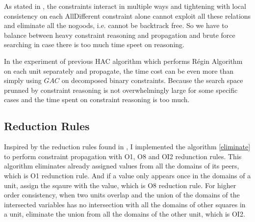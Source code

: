 \documentclass[a4paper, 12pt]{report}
\begin{document}
            As stated in \cite{simonis2005sudoku}, the constraints interact in multiple ways and tightening with local consistency on each AllDifferent constraint alone cannot exploit all these relations and eliminate all the nogoods, i.e. cannot be backtrack free. So we have to balance between heavy constraint reasoning and propagation and brute force searching in case there is too much time speet on reasoning.

            In the experiment of previous HAC algorithm which performs Régin Algorithm on each unit separately and propagate, the time cost can be even more than simply using $GAC$ on decomposed binary constraints. Because the search
            space prunned by constraint reasoning is not overwhelmingly large for some specific cases and the time spent on constraint reasoning is too much.
        \subsection{Reduction Rules}

            Inspired by the reduction rules found in \cite{lardeux2008managing,lardeux2008overlapping}, I implemented the algorithm \ref{eliminate} to perform constraint propagation with O1, O8 and OI2 redunction rules. This algorithm eliminates already assigned values from all the domains of its peers, which is O1 redunction rule. And if a value only appears once in the domains of a unit, assign the sqaure with the value, which is O8 reduction rule. For higher order consistency, when two units overlap
            and the union of the domains of the intersected variables has no intersection with all the domains of other squares in a unit, eliminate the union from all the domains of the other unit, which is OI2.
\end{document}
